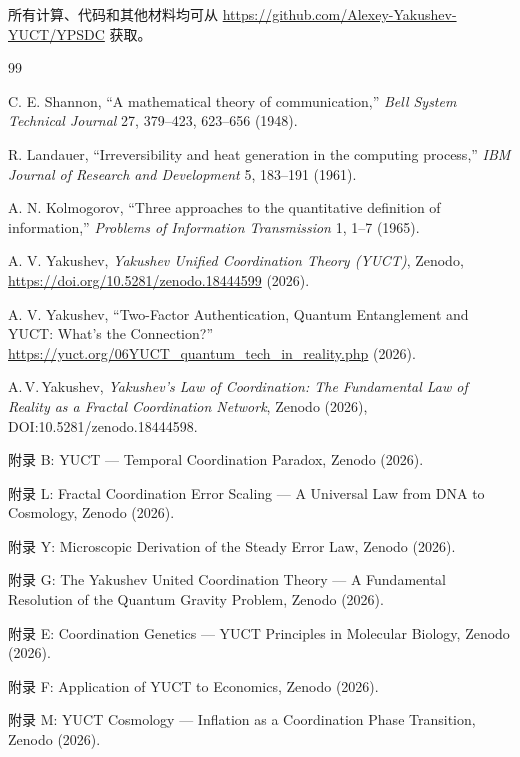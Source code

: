\documentclass[12pt,a4paper]{article}
\theoremstyle{remark}
\begin{document}
	所有计算、代码和其他材料均可从 \url{https://github.com/Alexey-Yakushev-YUCT/YPSDC} 获取。
	
	\begin{thebibliography}{99}
		
		C. E. Shannon, ``A mathematical theory of communication,'' \emph{Bell System Technical Journal} 27, 379–423, 623–656 (1948).
		
		R. Landauer, ``Irreversibility and heat generation in the computing process,'' \emph{IBM Journal of Research and Development} 5, 183–191 (1961).
		
		A. N. Kolmogorov, ``Three approaches to the quantitative definition of information,'' \emph{Problems of Information Transmission} 1, 1–7 (1965).
		
		A. V. Yakushev, \emph{Yakushev Unified Coordination Theory (YUCT)}, Zenodo, \url{https://doi.org/10.5281/zenodo.18444599} (2026).
		
		A. V. Yakushev, ``Two-Factor Authentication, Quantum Entanglement and YUCT: What's the Connection?'' \url{https://yuct.org/06YUCT_quantum_tech_in_reality.php} (2026).
		
		A.\,V.\,Yakushev, \emph{Yakushev's Law of Coordination: The Fundamental Law
			of Reality as a Fractal Coordination Network}, Zenodo (2026), DOI:10.5281/zenodo.18444598.
		
		附录 B: YUCT — Temporal Coordination Paradox, Zenodo (2026).
		
		附录 L: Fractal Coordination Error Scaling — A Universal Law from DNA to Cosmology, Zenodo (2026).
		
		附录 Y: Microscopic Derivation of the Steady Error Law, Zenodo (2026).
		
		附录 G: The Yakushev United Coordination Theory — A Fundamental Resolution of the Quantum Gravity Problem, Zenodo (2026).
		
		附录 E: Coordination Genetics — YUCT Principles in Molecular Biology, Zenodo (2026).
		
		附录 F: Application of YUCT to Economics, Zenodo (2026).
		
		附录 M: YUCT Cosmology — Inflation as a Coordination Phase Transition, Zenodo (2026).
		

\end{thebibliography}
\end{document}
